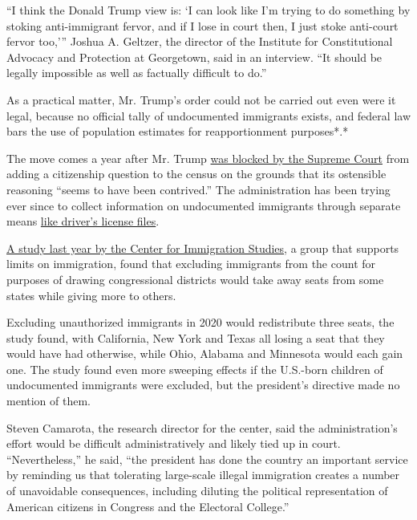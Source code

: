 ``I think the Donald Trump view is: `I can look like I'm trying to do
something by stoking anti-immigrant fervor, and if I lose in court then,
I just stoke anti-court fervor too,''' Joshua A. Geltzer, the director
of the Institute for Constitutional Advocacy and Protection at
Georgetown, said in an interview. ``It should be legally impossible as
well as factually difficult to do.''

As a practical matter, Mr. Trump's order could not be carried out even
were it legal, because no official tally of undocumented immigrants
exists, and federal law bars the use of population estimates for
reapportionment purposes*.*

The move comes a year after Mr. Trump
\href{https://www.nytimes3xbfgragh.onion/2019/07/02/us/trump-census-citizenship-question.html}{was
blocked by the Supreme Court} from adding a citizenship question to the
census on the grounds that its ostensible reasoning ``seems to have been
contrived.'' The administration has been trying ever since to collect
information on undocumented immigrants through separate means
\href{https://www.nytimes3xbfgragh.onion/aponline/2020/07/16/us/ap-us-census-citizenship.html}{like
driver's license files}.

\href{https://cis.org/Report/Impact-Legal-and-Illegal-Immigration-Apportionment-Seats-US-House-Representatives-2020}{A
study last year by the Center for Immigration Studies}, a group that
supports limits on immigration, found that excluding immigrants from the
count for purposes of drawing congressional districts would take away
seats from some states while giving more to others.

Excluding unauthorized immigrants in 2020 would redistribute three
seats, the study found, with California, New York and Texas all losing a
seat that they would have had otherwise, while Ohio, Alabama and
Minnesota would each gain one. The study found even more sweeping
effects if the U.S.-born children of undocumented immigrants were
excluded, but the president's directive made no mention of them.

Steven Camarota, the research director for the center, said the
administration's effort would be difficult administratively and likely
tied up in court. ``Nevertheless,'' he said, ``the president has done
the country an important service by reminding us that tolerating
large-scale illegal immigration creates a number of unavoidable
consequences, including diluting the political representation of
American citizens in Congress and the Electoral College.''

